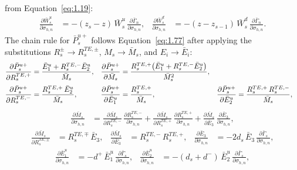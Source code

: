 \documentclass[12pt]{report}
\begin{document}
from Equation~\eqref{eq:1.19}:
\begin{align}
    \frac{\partial\bar{W}_s^u}{\partial\sigma_{h,n}}
    &= -(z_s - z)\,\bar{W}_s^u\,\frac{\partial\bar\Gamma_n}{\partial\sigma_{h,n}}, &
    \frac{\partial\bar{W}_s^d}{\partial\sigma_{h,n}}
    &= -(z - z_{s-1})\,\bar{W}_s^d\,\frac{\partial\bar\Gamma_n}{\partial\sigma_{h,n}}.
    \label{eq:1.87}
\end{align}
The chain rule for \(\bar P_s^{u+}\) follows Equation~\eqref{eq:1.77}
after applying the substitutions \(R_s^\pm\to R_s^{TE,\pm}\),
\(M_s\to\bar M_s\), and \(E_i\to\bar E_i\):
\begin{align}
    \frac{\partial\bar{P}_s^{u+}}{\partial R_s^{TE,+}}
    &= \frac{\bar{E}_1^u + R_s^{TE,-}\bar{E}_2^u}{\bar{M}_s}, &
    \frac{\partial\bar{P}_s^{u+}}{\partial\bar{M}_s}
    &= \frac{R_s^{TE,+}\!\left(\bar{E}_1^u + R_s^{TE,-}\bar{E}_2^u\right)}{\bar{M}_s^2},
    \notag \\[2pt]
    \frac{\partial\bar{P}_s^{u+}}{\partial R_s^{TE,-}}
    &= \frac{R_s^{TE,+}\,\bar{E}_2^u}{\bar{M}_s}, &
    \frac{\partial\bar{P}_s^{u+}}{\partial\bar{E}_1^u}
    &= \frac{R_s^{TE,+}}{\bar{M}_s}, &
    \frac{\partial\bar{P}_s^{u+}}{\partial\bar{E}_2^u}
    &= \frac{R_s^{TE,+}\,R_s^{TE,-}}{\bar{M}_s},
    \label{eq:1.88}
\end{align}
\begin{align}
    \frac{\partial\bar{M}_s}{\partial\sigma_{h,n}}
    &= \frac{\partial\bar{M}_s}{\partial R_s^{TE,-}}\,\frac{\partial R_s^{TE,-}}{\partial\sigma_{h,n}}
     + \frac{\partial\bar{M}_s}{\partial R_s^{TE,+}}\,\frac{\partial R_s^{TE,+}}{\partial\sigma_{h,n}}
     + \frac{\partial\bar{M}_s}{\partial\bar{E}_3}\,\frac{\partial\bar{E}_3}{\partial\sigma_{h,n}},
    \label{eq:1.89}
\end{align}
\begin{align}
    \frac{\partial\bar{M}_s}{\partial R_s^{TE,\pm}}
    &= R_s^{TE,\mp}\,\bar{E}_3, &
    \frac{\partial\bar{M}_s}{\partial\bar{E}_3}
    &= R_s^{TE,-}\,R_s^{TE,+}, &
    \frac{\partial\bar{E}_3}{\partial\sigma_{h,n}}
    &= -2d_s\,\bar{E}_3\,\frac{\partial\bar\Gamma_s}{\partial\sigma_{h,n}},
    \label{eq:1.90}
\end{align}
\begin{align}
    \frac{\partial\bar{E}_1^u}{\partial\sigma_{h,n}}
    &= -d^+\,\bar{E}_1^u\,\frac{\partial\bar\Gamma_s}{\partial\sigma_{h,n}}, &
    \frac{\partial\bar{E}_2^u}{\partial\sigma_{h,n}}
    &= -(d_s+d^-)\,\bar{E}_2^u\,\frac{\partial\bar\Gamma_s}{\partial\sigma_{h,n}},
    \label{eq:1.91}
\end{align}
\end{document}
